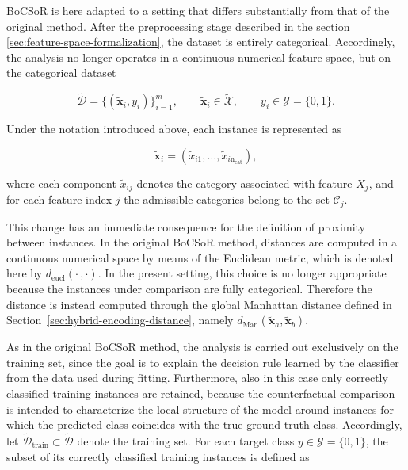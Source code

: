 BoCSoR is here adapted to a setting that differs substantially from that of the original method. After the preprocessing stage described in the section \ref{sec:feature-space-formalization}, the dataset is entirely categorical. Accordingly, the analysis no longer operates in a continuous numerical feature space, but on the categorical dataset

\begin{equation}
  \widetilde{\mathcal{D}} = \{(\tilde{\mathbf{x}}_i, y_i)\}_{i=1}^{m},
  \qquad \tilde{\mathbf{x}}_i \in \widetilde{\mathcal{X}},
  \qquad y_i \in \mathcal{Y}=\{0,1\}.
\end{equation}

Under the notation introduced above, each instance is represented as

\begin{equation}
  \tilde{\mathbf{x}}_i = (\tilde{x}_{i1},\dots,\tilde{x}_{i\mathrm{n_{cat}}}),
\end{equation}

where each component $\tilde{x}_{ij}$ denotes the category associated with feature $X_j$, and for each feature index $j$ the admissible categories belong to the set $\mathcal{C}_j$.

This change has an immediate consequence for the definition of proximity between instances. In the original BoCSoR method, distances are computed in a continuous numerical space by means of the Euclidean metric, which is denoted here by $d_{\mathrm{eucl}}(\cdot \, , \cdot)$. In the present setting, this choice is no longer appropriate because the instances under comparison are fully categorical. Therefore the distance is instead computed through the global Manhattan distance defined in Section~\ref{sec:hybrid-encoding-distance}, namely $d_{\mathrm{Man}}(\tilde{\mathbf{x}}_a,\tilde{\mathbf{x}}_b)$.

As in the original BoCSoR method, the analysis is carried out exclusively on the training set, since the goal is to explain the decision rule learned by the classifier from the data used during fitting. Furthermore, also in this case only correctly classified training instances are retained, because the counterfactual comparison is intended to characterize the local structure of the model around instances for which the predicted class coincides with the true ground-truth class. Accordingly, let $\widetilde{\mathcal{D}}_{\mathrm{train}} \subset \widetilde{\mathcal{D}}$ denote the training set. For each target class $y \in \mathcal{Y}=\{0,1\}$, the subset of its correctly classified training instances is defined as

